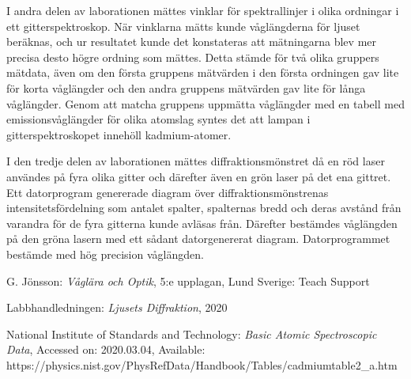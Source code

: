 \documentclass[conference]{IEEEtran}
\begin{document}
I andra delen av laborationen mättes vinklar för spektrallinjer i olika ordningar i ett gitterspektroskop. När vinklarna mätts kunde våglängderna för ljuset beräknas, och ur resultatet kunde det konstateras att mätningarna blev mer precisa desto högre ordning som mättes. Detta stämde för två olika gruppers mätdata, även om den första gruppens mätvärden i den första ordningen gav lite för korta våglängder och den andra gruppens mätvärden gav lite för långa våglängder. Genom att matcha gruppens uppmätta våglängder med en tabell med emissionsvåglängder för olika atomslag syntes det att lampan i gitterspektroskopet innehöll kadmium-atomer. 

I den tredje delen av laborationen mättes diffraktionsmönstret då en röd laser användes på fyra olika gitter och därefter även en grön laser på det ena gittret. Ett datorprogram genererade diagram över diffraktionsmönstrenas intensitetsfördelning som antalet spalter, spalternas bredd och deras avstånd från varandra för de fyra gitterna kunde avläsas från. Därefter bestämdes våglängden på den gröna lasern med ett sådant datorgenererat diagram. Datorprogrammet bestämde med hög precision våglängden.












%
% 


\begin{thebibliography}{77}
	
G. Jönsson: \emph{Våglära och Optik}, 5:e upplagan, Lund Sverige: Teach Support

Labbhandledningen: \emph{Ljusets Diffraktion}, 2020

National Institute of Standards and Technology: \emph{Basic Atomic Spectroscopic Data}, Accessed on: 2020.03.04, Available: https://physics.nist.gov/PhysRefData/Handbook/Tables/cadmiumtable2_a.htm

\end{thebibliography}
\end{document}
